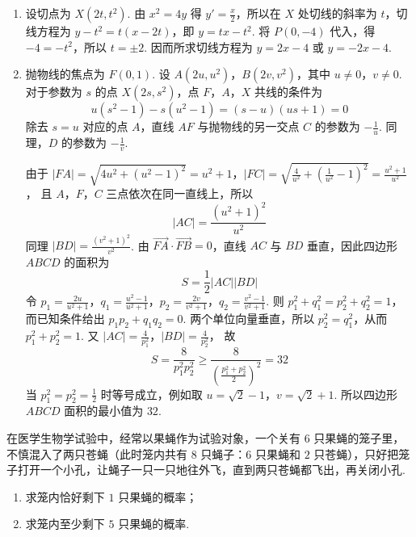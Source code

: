 \begin{solution}
\begin{enumerate}
\item 设切点为 \(X(2t,t^{2})\). 由 \(x^{2}=4y\) 得 \(y'=\frac{x}{2}\)，所以在 \(X\) 处切线的斜率为 \(t\)，切线方程为 \(y-t^{2}=t(x-2t)\)，即 \(y=tx-t^{2}\). 将 \(P(0,-4)\) 代入，得 \(-4=-t^{2}\)，所以 \(t=\pm2\). 因而所求切线方程为 \(y=2x-4\) 或 \(y=-2x-4\).
\item 抛物线的焦点为 \(F(0,1)\). 设 \(A(2u,u^{2})\)，\(B(2v,v^{2})\)，其中 \(u\neq0\)，\(v\neq0\). 对于参数为 \(s\) 的点 \(X(2s,s^{2})\)，点 \(F\)，\(A\)，\(X\) 共线的条件为
\[
u(s^{2}-1)-s(u^{2}-1)=(s-u)(us+1)=0
\]
除去 \(s=u\) 对应的点 \(A\)，直线 \(AF\) 与抛物线的另一交点 \(C\) 的参数为 \(-\frac{1}{u}\). 同理，\(D\) 的参数为 \(-\frac{1}{v}\).

由于
\(|FA|=\sqrt{4u^{2}+(u^{2}-1)^{2}}=u^{2}+1\)，\(|FC|=\sqrt{\frac4{u^{2}}+\left(\frac1{u^{2}}-1\right)^{2}}=\frac{u^{2}+1}{u^{2}}\)，
且 \(A\)，\(F\)，\(C\) 三点依次在同一直线上，所以
\[
|AC|=\frac{(u^{2}+1)^{2}}{u^{2}}
\]
同理 \(|BD|=\frac{(v^{2}+1)^{2}}{v^{2}}\). 由 \(\overrightarrow{FA}\cdot\overrightarrow{FB}=0\)，直线 \(AC\) 与 \(BD\) 垂直，因此四边形 \(ABCD\) 的面积为
\[
S=\frac12|AC||BD|
\]
令
\(p_{1}=\frac{2u}{u^{2}+1}\)，\(q_{1}=\frac{u^{2}-1}{u^{2}+1}\)，\(p_{2}=\frac{2v}{v^{2}+1}\)，\(q_{2}=\frac{v^{2}-1}{v^{2}+1}\).
则 \(p_{1}^{2}+q_{1}^{2}=p_{2}^{2}+q_{2}^{2}=1\)，而已知条件给出 \(p_{1}p_{2}+q_{1}q_{2}=0\). 两个单位向量垂直，所以 \(p_{2}^{2}=q_{1}^{2}\)，从而 \(p_{1}^{2}+p_{2}^{2}=1\). 又
\(|AC|=\frac4{p_{1}^{2}}\)，\(|BD|=\frac4{p_{2}^{2}}\)，
故
\[
S=\frac8{p_{1}^{2}p_{2}^{2}}
\geqslant\frac8{\left(\frac{p_{1}^{2}+p_{2}^{2}}2\right)^{2}}
=32
\]
当 \(p_{1}^{2}=p_{2}^{2}=\frac12\) 时等号成立，例如取 \(u=\sqrt2-1\)，\(v=\sqrt2+1\). 所以四边形 \(ABCD\) 面积的最小值为 \(32\).
\end{enumerate}
\end{solution}

\begin{problem}
在医学生物学试验中，经常以果蝇作为试验对象，一个关有 \(6\) 只果蝇的笼子里，不慎混入了两只苍蝇（此时笼内共有 \(8\) 只蝇子：\(6\) 只果蝇和 \(2\) 只苍蝇），只好把笼子打开一个小孔，让蝇子一只一只地往外飞，直到两只苍蝇都飞出，再关闭小孔.

\begin{enumerate}
\item 求笼内恰好剩下 \(1\) 只果蝇的概率；
\item 求笼内至少剩下 \(5\) 只果蝇的概率.
\end{enumerate}
\end{problem}

